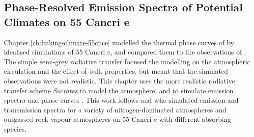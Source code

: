 \begin{SingleSpace}
\chapter{Phase-Resolved Emission Spectra of Potential Climates on 55 Cancri e}\label{ch:clouds-lava-planets}
\end{SingleSpace}





Chapter \ref{ch:linking-climate-55cnce} modelled the thermal phase curves of by idealised simulations of 55 Cancri e, and compared them to the observations of \citet{demory201655cnce}. The simple semi-grey radiative transfer focused the modelling on the atmospheric circulation and the effect of bulk properties, but meant that the simulated observations were not realistic. This chapter uses the more realistic radiative transfer scheme \textit{Socrates} to model the atmosphere, and to simulate emission spectra and phase curves \citep{edwards1996socrates}. This work follows \citet{miguel2018observability} and \citet{ito2015theoretical} who simulated emission and transmission spectra for a variety of nitrogen-dominated atmospheres and outgassed rock vapour atmospheres on 55 Cancri e with different absorbing species.




